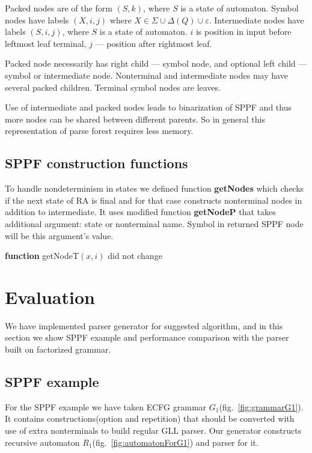 \documentclass[runningheads,a4paper]{llncs}
\begin{document}
Packed nodes are of the form $(S, k)$, where $S$ is a state of automaton. 
Symbol nodes have labels $(X, i, j)$ where $X \in \Sigma \cup \Delta(Q) \cup \varepsilon$. 
Intermediate nodes have labels $ (S, i, j) $, where $S$ is a state of automaton. $i$ is position in input before leftmost leaf terminal, $j$ --- position after rightmost leaf.

Packed node necessarily has right child --- symbol node, and optional left child --- symbol or intermediate node.
Nonterminal and intermediate nodes may have several packed children. 
Terminal symbol nodes are leaves.

Use of intermediate and packed nodes leads to binarization of 
SPPF and thus more nodes can be shared between different parents. So in general this representation of 
parse forest requires less memory.

\subsection{SPPF construction functions}

To handle nondeterminism in states we defined function \textbf{getNodes} which checks if the next state of RA
is final and for that case constructs nonterminal nodes in addition to intermediate.
It uses modified function \textbf{getNodeP} that takes additional argument: state or nonterminal name.
Symbol in returned SPPF node will be this argument's value.


\textbf{function} getNodeT$(x,i)$ did not change

\section{Evaluation}

We have implemented parser generator for suggested algorithm, and
in this section we show SPPF example and performance comparison 
with the parser built on factorized grammar.

\subsection{SPPF example}

For the SPPF example we have taken ECFG grammar $G_1$(fig.~\ref{fig:grammarG1}).
It contains constructions(option and repetition) that should be converted with
use of extra nonterminals to build regular GLL parser. Our generator constructs
recursive automaton $R_1$(fig.~\ref{fig:automatonForG1}) and parser for it.
\end{document}
